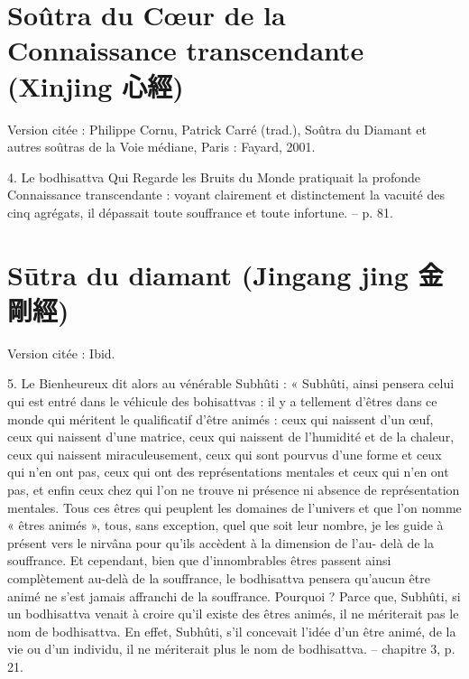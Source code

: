  


\section{Soûtra du Cœur de la Connaissance transcendante
(Xinjing 心經)}


Version citée : Philippe Cornu, Patrick Carré (trad.), Soûtra du Diamant et autres soûtras de la Voie médiane, Paris : Fayard, 2001.

\begin{singlequote}
    4.	Le bodhisattva Qui Regarde les Bruits du Monde pratiquait la profonde Connaissance transcendante : voyant clairement et distinctement la vacuité des cinq agrégats, il dépassait toute souffrance et toute infortune.
-- p. 81.
\end{singlequote}



\section{Sūtra du diamant (Jingang jing 金剛經)}


Version citée : Ibid.

\begin{singlequote}
    5.	Le Bienheureux dit alors au vénérable Subhûti :
« Subhûti, ainsi pensera celui qui est entré dans le véhicule des bohisattvas : il y a tellement d’êtres dans ce monde qui méritent le qualificatif d’être animés : ceux qui naissent d’un œuf, ceux qui naissent d’une matrice, ceux qui naissent de l’humidité et de la chaleur, ceux qui naissent miraculeusement, ceux qui sont pourvus d’une forme et ceux qui n’en ont pas, ceux qui ont des représentations mentales et ceux qui n’en ont pas, et enfin ceux chez qui l’on ne trouve ni présence ni absence de représentation mentales. Tous ces êtres qui peuplent les domaines de l’univers et que l’on nomme « êtres animés », tous, sans exception, quel que soit leur nombre, je les guide à présent vers le nirvâna pour qu’ils accèdent à la dimension de l’au- delà de la souffrance. Et cependant, bien que d’innombrables êtres passent ainsi complètement au-delà de la souffrance, le bodhisattva pensera qu’aucun être animé ne s’est jamais affranchi de la souffrance. Pourquoi ? Parce que, Subhûti, si un bodhisattva venait à croire qu’il existe des êtres animés, il ne mériterait pas le nom de bodhisattva. En effet, Subhûti, s’il concevait l’idée d’un être animé, de la vie ou d’un individu, il ne mériterait plus le nom de bodhisattva.
-- chapitre 3, p. 21.
\end{singlequote}

